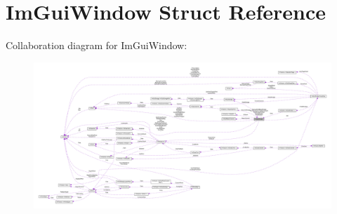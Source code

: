 \hypertarget{structImGuiWindow}{}\section{Im\+Gui\+Window Struct Reference}
\label{structImGuiWindow}


Collaboration diagram for Im\+Gui\+Window\+:\nopagebreak
\begin{figure}[H]
\begin{center}
\leavevmode
\includegraphics[width=350pt]{structImGuiWindow__coll__graph}
\end{center}
\end{figure}
